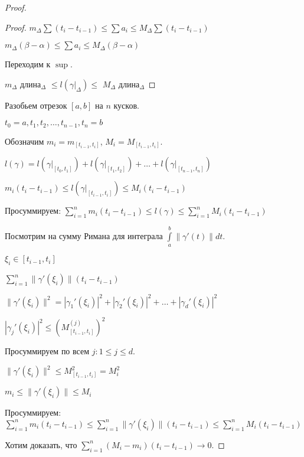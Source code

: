 \begin{proof}
\begin{proof}
            $m_{\Delta}\sum(t_i-t_{i-1}) \le \sum a_i \le M_{\Delta}\sum(t_i-t_{i-1})$

            $m_{\Delta}(\beta - \alpha) \le \sum a_i \le M_{\Delta}(\beta - \alpha)$

            Переходим к $\sup$.

            $m_{\Delta}$ длина$_{\Delta}$ $\le l(\gamma|_{\Delta}) \le$ $M_{\Delta}$ длина$_{\Delta}$           
        
        \end{proof}

        Разобьем отрезок $[a, b]$ на $n$ кусков.

        $t_0 = a, t_1, t_2, \dots, t_{n-1}, t_n = b$

        Обозначим $m_i = m_{[t_{i-1}, t_i]}$, $M_i = M_{[t_{i-1}, t_i]}$.
        
        $l(\gamma) = l(\gamma|_{[t_0, t_1]}) + l(\gamma|_{[t_1, t_2]}) + \dots + l(\gamma|_{[t_{n - 1}, t_n]})$

        $m_i(t_i - t_{i - 1}) \le l(\gamma|_{[t_{i - 1}, t_i]}) \le M_i(t_i - t_{i - 1})$

        Просуммируем:
        $\sum\limits_{i = 1}^n m_i(t_i - t_{i - 1}) \le l(\gamma) \le \sum\limits_{i = 1}^n M_i(t_i - t_{i - 1})$

        Посмотрим на сумму Римана для интеграла $\int\limits_a^b \|\gamma'(t)\|dt$.
        
        $\xi_i \in [t_{i - 1}, t_i]$

        $\sum\limits_{i = 1}^n \|\gamma'(\xi_i)\| (t_i - t_{i - 1})$

        $\|\gamma'(\xi_i)\|^2 = |\gamma_1'(\xi_i)|^2 + |\gamma_2'(\xi_i)|^2 + \dots + |\gamma_d'(\xi_i)|^2$

        $|\gamma_j'(\xi_i)|^2 \le (M_{[t_{i - 1}, t_i]}^{(j)})^2$

        Просуммируем по всем $j \colon 1 \le j \le d$.

        $\|\gamma'(\xi_i)\|^2 \le M_{[t_{i - 1}, t_i]}^2 = M_i^2$
        
        $m_i \le \|\gamma'(\xi_i)\| \le M_i$

        Просуммируем: $\sum\limits_{i = 1}^n m_i(t_i - t_{i - 1}) \le 
        \sum\limits_{i = 1}^n \|\gamma'(\xi_i)\| (t_i - t_{i - 1}) \le 
        \sum\limits_{i = 1}^n M_i(t_i - t_{i - 1})$

        Хотим доказать, что $\sum\limits_{i = 1}^n (M_i - m_i)(t_i - t_{i - 1}) \rightarrow 0$.


\end{proof}

